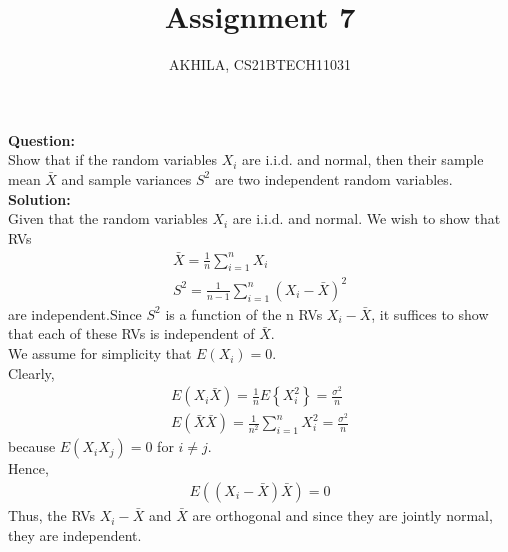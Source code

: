 \documentclass[journal,12pt,twocolumn]{IEEEtran}
\title{Assignment 7}
\author{AKHILA, CS21BTECH11031}
\newcommand{\question}{\noindent \textbf{Question: }}
\newcommand{\solution}{\noindent \textbf{Solution: }}
\providecommand{\cbrak}[1]{\ensuremath{\left\{#1\right\}}}
\providecommand{\brak}[1]{\ensuremath{\left(#1\right)}}
\begin{document}
\maketitle
\question\\
Show that if the random variables $X_i$ are i.i.d. and normal, then their sample mean $\bar{X}$ and sample variances $S^2$ are two independent random variables.\\
\solution\\

Given that the random variables $X_i$ are i.i.d. and normal.
We wish to show that RVs
\begin{align}
    \bar{X}=\frac{1}{n} \sum_{i=1}^{n}X_i\\
    S^2=\frac{1}{n-1} \sum_{i=1}^{n} \brak{{X_i}-\bar{X}}^2
\end{align}
are independent.Since $S^2$ is a function of the n RVs $X_i-\bar{X}$, it suffices to show that each of these RVs is independent of $\bar{X}$.\\

We assume for simplicity that $E(X_i)=0$.\\
Clearly,\\
\begin{align}
  E(X_i\bar{X})=\frac{1}{n}E\cbrak{X_i^2}=\frac{\sigma^2}{n}\\
  E(\bar{X}\bar{X})=\frac{1}{n^2}\sum_{i=1}^{n} X_i^2=\frac{\sigma^2}{n}
\end{align}
because $E(X_iX_j)=0$ for $i\neq j$.\\Hence,
\begin{align}
      E((X_i-\bar{X})\bar{X})=0
\end{align}
Thus, the RVs $X_i-\bar{X}$ and $\bar{X}$ are orthogonal and since they are jointly normal, they are independent.
\end{document}

